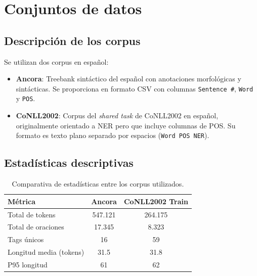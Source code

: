 \documentclass[12pt, a4paper]{article}
\begin{document}
\section{Conjuntos de datos}

\subsection{Descripción de los corpus}

Se utilizan dos corpus en español:

\begin{itemize}
    \item \textbf{Ancora}: Treebank sintáctico del español con anotaciones
          morfológicas y sintácticas. Se proporciona en formato CSV con columnas
          \texttt{Sentence \#}, \texttt{Word} y \texttt{POS}.
    \item \textbf{CoNLL2002}: Corpus del \textit{shared task} de CoNLL2002 en
          español, originalmente orientado a NER pero que incluye columnas de POS.
          Su formato es texto plano separado por espacios (\texttt{Word POS NER}).
\end{itemize}

\subsection{Estadísticas descriptivas}

\begin{table}[H]
    \centering
    \caption{Comparativa de estadísticas entre los corpus utilizados.}
    \label{tab:stats}
    \begin{tabular}{lcc}
        \toprule
        \textbf{Métrica}       & \textbf{Ancora} & \textbf{CoNLL2002 Train} \\
        \midrule
        Total de tokens        & 547.121             & 264.175                      \\
        Total de oraciones     & 17.345             & 8.323                     \\
        Tags únicos            & 16             & 59                      \\
        Longitud media (tokens)& 31.5             & 31.8                      \\
        P95 longitud           & 61             & 62                      \\
        \bottomrule
    \end{tabular}
\end{table}
\end{document}
